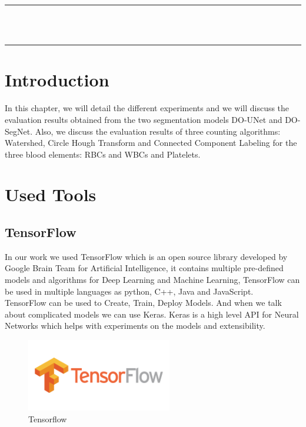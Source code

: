 \thispagestyle{empty}
\vspace*{\fill}
\begin{center}
    {\color{Black} \rule{\linewidth}{1.2mm} }\\
\vspace{0.25in}
{\centering{}}
\vspace{0.35in}\\
    {\color{Black} \rule{\linewidth}{1.2mm} }
\end{center}
\vspace*{\fill}
\setcounter{section}{0}

\newpage

\section{Introduction}
\vspace{0.2in}
\hspace{\parindent}
In this chapter, we will detail the different experiments and we will discuss the evaluation results obtained from the two segmentation models DO-UNet and DO-SegNet. Also, we discuss the evaluation results of three counting algorithms: Watershed, Circle Hough Transform and Connected Component Labeling for the three blood elements: RBCs and WBCs and Platelets.

\section{Used Tools}
\subsection{TensorFlow}
\hspace{\parindent}
In our work we used TensorFlow which is an open source library developed by Google Brain Team for Artificial Intelligence, it contains multiple pre-defined models and algorithms for Deep Learning and Machine Learning, TensorFlow can be used in multiple languages as python, C++, Java and JavaScript.\\
TensorFlow can be used to Create, Train, Deploy Models. And when we talk about complicated models we can use Keras.
Keras is a high level API for Neural Networks which helps with experiments on the models and extensibility.

\begin{figure}[H]
    \centering
      \vspace{-0.1in}
        \centerline{\includegraphics[width = 2.5in]{../images/tensorflow.png}}
        \caption{Tensorflow}
        \label{Tensorflow}
    \end{figure}

